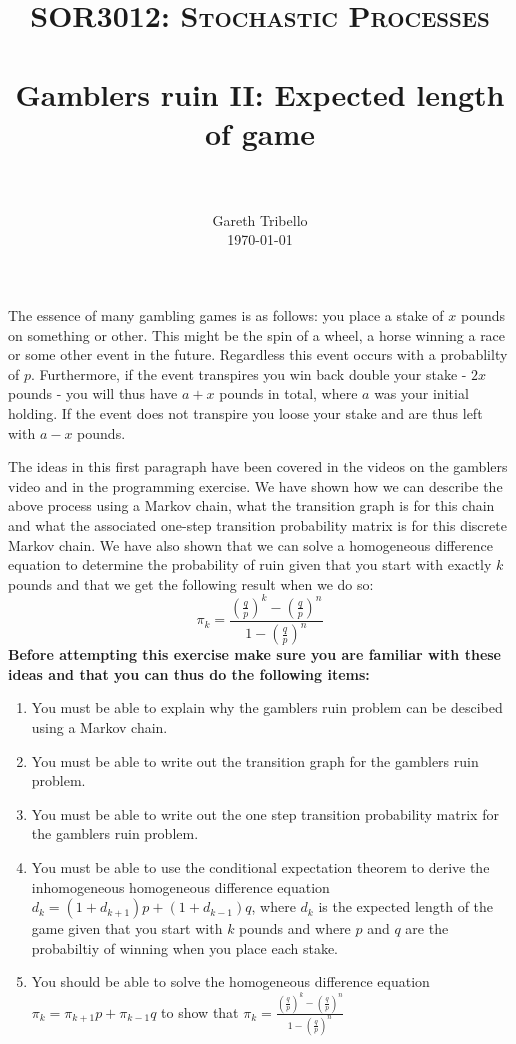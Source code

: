 \documentclass[paper=a4, fontsize=11pt]{scrartcl}
\title{\usefont{OT1}{bch}{b}{n} \normalfont \normalsize \textsc{SOR3012:
Stochastic Processes} \\ [25pt] \horrule{0.5pt} \\[0.4cm] 
\huge Gamblers ruin II: Expected length of game \\
\horrule{2pt} \\[0.25cm]
}
\author{ \normalfont
\normalsize
        Gareth Tribello \\[-3pt] \normalsize
        \today
}
\date{}
\numberwithin{equation}{section}
\numberwithin{figure}{section}
\numberwithin{table}{section}
\begin{document}
\maketitle

The essence of many gambling games is as follows: you place a stake of $x$ pounds on something or other.  This might be the spin of a wheel, a horse winning a race or some other event in the future.  
Regardless this event occurs with a probablilty of $p$.  Furthermore, if the event transpires you win back double your stake - $2x$ pounds - you will thus have $a + x$ pounds in total, where $a$ was 
your initial holding.  If the event does not transpire you loose your stake and are thus left with $a - x$ pounds.  

The ideas in this first paragraph have been covered in the videos on the gamblers video and in the programming exercise.  We have shown how we can describe the above process using a Markov chain, 
what the transition graph is for this chain and what the associated one-step transition probability matrix is for this discrete Markov chain.  We have also shown that we can solve a homogeneous 
difference equation to determine the probability of ruin given that you start with exactly $k$ pounds and that we get the following result when we do so:
$$
\pi_k = \frac{ \left( \frac{q}{p} \right)^k - \left( \frac{q}{p} \right)^n }{ 1 - \left( \frac{q}{p} \right)^n }
$$
{\bf Before attempting this exercise make sure you are familiar with these ideas and that you can thus do the following items:}

\begin{enumerate}
 \item You must be able to explain why the gamblers ruin problem can be descibed using a Markov chain.
 \item You must be able to write out the transition graph for the gamblers ruin problem.
 \item You must be able to write out the one step transition probability matrix for the gamblers ruin problem.
 \item You must be able to use the conditional expectation theorem to derive the inhomogeneous homogeneous difference equation $d_k = (1+d_{k+1})p + (1 + d_{k-1})q$, where $d_k$ is the 
expected length of the game given that you start with $k$ pounds and where $p$ and $q$ are the probabiltiy of winning when you place each stake.
\item You should be able to solve the homogeneous difference equation $\pi_k = \pi_{k+1} p + \pi_{k-1} q$ to show that $\pi_k = \frac{ \left( \frac{q}{p} \right)^k - \left( \frac{q}{p} 
\right)^n }{ 1 - \left( \frac{q}{p} \right)^n }$
\end{enumerate}
\end{document}
